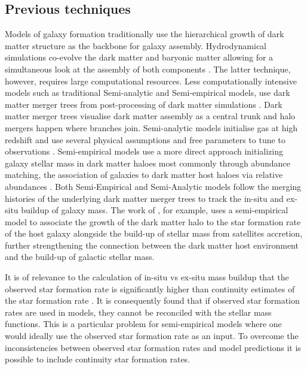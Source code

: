 \subsection{Previous techniques}

Models of galaxy formation traditionally use the hierarchical growth of dark matter structure as the backbone for galaxy assembly. Hydrodynamical simulations co-evolve the dark matter and baryonic matter allowing for a simultaneous look at the assembly of both components \citep{McAlpine2015TheCatalogues,Vogelsberger2014IntroducingUniverse}. The latter technique, however, requires large computational resources. Less computationally intensive models such as traditional Semi-analytic and Semi-empirical models, use dark matter merger trees from post-processing of dark matter simulations \citep{Guo2011FromCosmology, Shankar2013}. Dark matter merger trees visualise dark matter assembly as a central trunk and halo mergers happen where branches join. Semi-analytic models initialise gas at high redshift and use several physical assumptions and free parameters to tune to observations \citep{DeLucia2006TheGalaxies, Guo2011FromCosmology}. Semi-empirical models use a more direct approach initializing galaxy stellar mass in dark matter haloes most commonly through abundance matching, the association of galaxies to dark matter host haloes via relative abundances \citep{Hopkins2010MERGERSMATTER, Zavala2012, Moster2013, Shankar2014, Moster2018Emerge10}. Both Semi-Empirical and Semi-Analytic models follow the merging histories of the underlying dark matter merger trees to track the in-situ and ex-situ buildup of galaxy mass. The work of \citet{Moster2018Emerge10}, for example, uses a semi-empirical model to associate the growth of the dark matter halo to the star formation rate of the host galaxy alongside the build-up of stellar mass from satellites accretion, further strengthening the connection between the dark matter host environment and the build-up of galactic stellar mass.


It is of relevance to the calculation of in-situ vs ex-situ mass buildup that the observed star formation rate is significantly higher than continuity estimates of the star formation rate \citep[e.g.][]{Leja2015ReconcilingFunction, Lapi2017StellarEquation}. It is consequently found that if observed star formation rates are used in models, they cannot be reconciled with the stellar mass functions. This is a particular problem for semi-empirical models where one would ideally use the observed star formation rate as an input. To overcome the inconsistencies between observed star formation rates and model predictions it is possible to include continuity star formation rates.


